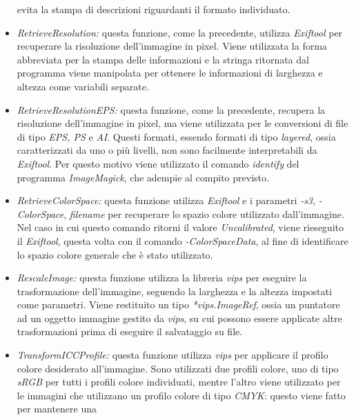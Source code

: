 \begin{itemize}
            evita la stampa di descrizioni riguardanti il formato individuato.
      \item \emph{RetrieveResolution:} questa funzione, come la precedente,
            utilizza \emph{Exiftool} per recuperare la risoluzione dell'immagine in
            pixel. Viene utilizzata la forma abbreviata per la stampa delle informazioni
            e la stringa ritornata dal programma viene manipolata per ottenere le
            informazioni di larghezza e altezza come variabili separate.
      \item \emph{RetrieveResolutionEPS:} questa funzione, come la precedente,
            recupera la risoluzione dell'immagine in pixel, ma viene utilizzata per le
            conversioni di file di tipo \emph{EPS, PS} e \emph{AI}. Questi formati,
            essendo formati di tipo \emph{layered}, ossia caratterizzati da uno o più
            livelli, non sono facilmente interpretabili da \emph{Exiftool}. Per questo
            motivo viene utilizzato il comando \emph{identify} del programma
            \emph{ImageMagick}, che adempie al compito previsto.
      \item \emph{RetrieveColorSpace:} questa funzione utilizza \emph{Exiftool} e
            i parametri \emph{-s3}, \emph{-ColorSpace}, \emph{filename} per recuperare
            lo spazio colore utilizzato dall'immagine. Nel caso in cui questo comando
            ritorni il valore \emph{Uncalibrated}, viene rieseguito il \emph{Exiftool},
            questa volta con il comando \emph{-ColorSpaceData}, al fine di identificare
            lo spazio colore generale che è stato utilizzato.
      \item \emph{RescaleImage:} questa funzione utilizza la libreria \emph{vips}
            per eseguire la trasformazione dell'immagine, seguendo la larghezza e la
            altezza impostati come parametri. Viene restituito un tipo
            \emph{*vips.ImageRef}, ossia un puntatore ad un oggetto immagine gestito da
            \emph{vips}, su cui possono essere applicate altre trasformazioni prima di
            eseguire il salvataggio su file.
      \item \emph{TransformICCProfile:} questa funzione utilizza \emph{vips} per
            applicare il profilo colore desiderato all'immagine. Sono utilizzati due
            profili colore, uno di tipo \emph{sRGB} per tutti i profili colore
            individuati, mentre l'altro viene utilizzato per le immagini che utilizzano
            un profilo colore di tipo \emph{CMYK}: questo viene fatto per mantenere una

\end{itemize}
